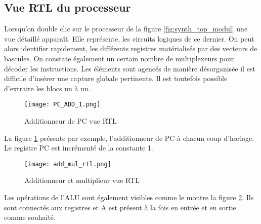 \subsection{Vue RTL du processeur}
Lorsqu'on double clic sur le processeur de la figure \ref{fig:synth_top_modul} une vue détaillé apparaît.
Elle représente, les circuits logiques de ce dernier.
On peut alors identifier rapidement, les différents registres matérialisés par des vecteurs de bascules.
On constate également un certain nombre de multiplexeurs pour décoder les instructions.
Les éléments sont agencés de manière désorganisée il est difficile d'insérer une capture globale pertinente.
Il est toutefois possible d'extraire les blocs un à un.
\begin{figure}[H]
	\centering
	\texttt{[image: PC\_ADD\_1.png]}
	\caption{Additionneur de PC vue RTL}
	\label{fig:PC_ADD}
\end{figure}
La figure \ref{fig:PC_ADD} présente par exemple, l'additionneur de PC à chacun coup d'horloge.
Le registre PC est incrémenté de la constante 1.
\begin{figure}[H]
	\centering
	\texttt{[image: add\_mul\_rtl.png]}
	\caption{Additionneur et multiplieur vue RTL}
	\label{fig:ADD_MUL}
\end{figure}
Les opérations de l'\gls{ALU} sont également visibles comme le montre la figure \ref{fig:ADD_MUL}.
Ils sont connectés aux registres et A est présent à la fois en entrée et en sortie comme souhaité.

